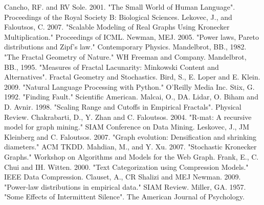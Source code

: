 \documentclass[12pt]{article}
\begin{document}


\begin{thebibliography}{99}
    Cancho, RF. and RV Sole. 2001. "The Small World of Human Language". Proceedings of the Royal Society B: Biological Sciences.
    Lekovec, J., and Faloutsos, C. 2007. "Scalable Modeling of Real Graphs Using Kronecker Multiplication." Proceedings of ICML.
    Newman, MEJ. 2005. "Power laws, Pareto distributions and Zipf's law." Contemporary Physics.
    Mandelbrot, BB., 1982. "The Fractal Geometry of Nature." WH Freeman and Company.
    Mandelbrot, BB., 1995. "Measures of Fractal Lacunarity: Minkowski Content and Alternatives". Fractal Geometry and Stochastics.
    Bird, S., E. Loper and E. Klein. 2009. "Natural Language Processing with Python." O'Reilly Media Inc.
    Stix, G. 1992. "Finding Fault." Scientific American.
    Malcai, O., DA. Lidar, O. Biham and D. Avnir. 1998. "Scaling Range and Cutoffs in Empirical Fractals". Physical Review.
    Chakrabarti, D., Y. Zhan and C. Faloutsos. 2004. "R-mat: A recursive model for graph mining." SIAM Conference on Data Mining.
    Leskovec, J., JM Kleinberg and C. Faloutsos. 2007. "Graph evolution: Densification and shrinking diameters." ACM TKDD.
    Mahdian, M., and Y. Xu. 2007. "Stochastic Kronecker Graphs." Workshop on Algorithms and Models for the Web Graph.
    Frank, E., C. Chui and IH. Witten. 2000. "Text Categorization using Compression Models." IEEE Data Compression.
    Clauset, A., CR Shalizi and MEJ Newman. 2009. "Power-law distributions in empirical data." SIAM Review.
    Miller, GA. 1957. "Some Effects of Intermittent Silence". The American Journal of Psychology.
\end{thebibliography}
\end{document}
